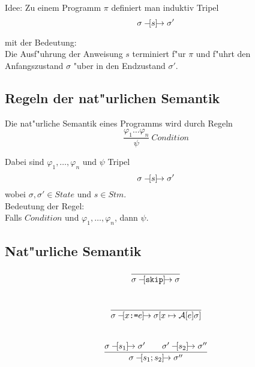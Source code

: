 \documentclass[german,10pt, a4paper, twocolumn]{scrartcl}
\newcommand{\natsemarr}[1]{\ensuremath{-\hspace*{-1.52mm}[#1]\hspace*{-1.61mm}\rightarrow}}
\theoremstyle{definition}
\theoremstyle{remark}
\begin{document}
Idee: Zu einem Programm $\pi$ definiert man induktiv Tripel
\begin{displaymath}
	\sigma \natsemarr{s} \sigma'
\end{displaymath}

mit der Bedeutung:\\
Die Ausf"uhrung der Anweisung $s$ terminiert f"ur $\pi$ und f"uhrt den Anfangszustand $\sigma$ "uber in den Endzustand $\sigma'$.

\subsection{Regeln der nat"urlichen Semantik}

Die nat"urliche Semantik eines Programms wird durch Regeln
\begin{displaymath}
	\frac{\varphi_1 \hdots \varphi_n}{\psi}\  Condition
\end{displaymath}

Dabei sind $\varphi_1,\ldots,\varphi_n$ und $\psi$ Tripel
\begin{displaymath}
	\sigma \natsemarr{s} \sigma'
\end{displaymath}
wobei $\sigma,\sigma'\in State$ und $s\in Stm.$\\

Bedeutung der Regel:\\
Falls $Condition$ und $\varphi_1,\ldots,\varphi_n$, dann $\psi$.

\onecolumn

\subsection{Nat"urliche Semantik}

\begin{displaymath}
	\frac{}{\sigma \natsemarr{\mbox{\tt skip}} \sigma}
\end{displaymath}\\

\begin{displaymath}
	\frac{}{\sigma \natsemarr{x \mbox{\tt :=} e} \sigma[x \mapsto \mathcal{A}[e]\sigma]}
\end{displaymath}\\

\begin{displaymath}
	\frac{\sigma \natsemarr{s_1} \sigma' \qquad \sigma' \natsemarr{s_2} \sigma''}{\sigma \natsemarr{s_1;s_2} \sigma''}
\end{displaymath}\\
\end{document}
